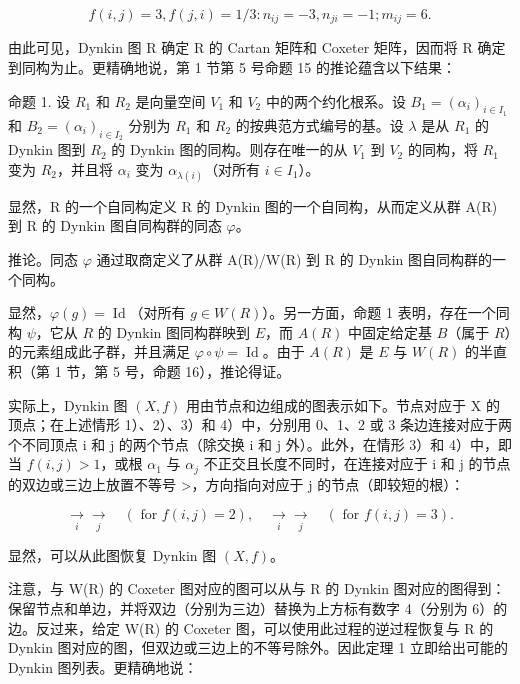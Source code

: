 \[
f (i, j) = 3, f (j, i) = 1 / 3: n _ {i j} = - 3, n _ {j i} = - 1; m _ {i j} = 6.
\]

由此可见，Dynkin 图 R 确定 R 的 Cartan 矩阵和 Coxeter 矩阵，因而将 R 确定到同构为止。更精确地说，第 1 节第 5 号命题 15 的推论蕴含以下结果：

命题 1. 设 \(R_{1}\) 和 \(R_{2}\) 是向量空间 \(V_{1}\) 和 \(V_{2}\) 中的两个约化根系。设 \(B_{1} = (\alpha_{i})_{i \in I_{1}}\) 和 \(B_{2} = (\alpha_{i})_{i \in I_{2}}\) 分别为 \(R_{1}\) 和 \(R_{2}\) 的按典范方式编号的基。设 \(\lambda\) 是从 \(R_{1}\) 的 Dynkin 图到 \(R_{2}\) 的 Dynkin 图的同构。则存在唯一的从 \(V_{1}\) 到 \(V_{2}\) 的同构，将 \(R_{1}\) 变为 \(R_{2}\)，并且将 \(\alpha_{i}\) 变为 \(\alpha_{\lambda(i)}\)（对所有 \(i \in I_{1}\)）。

显然，R 的一个自同构定义 R 的 Dynkin 图的一个自同构，从而定义从群 A(R) 到 R 的 Dynkin 图自同构群的同态 \(\varphi\)。

推论。同态 \(\varphi\) 通过取商定义了从群 A(R)/W(R) 到 R 的 Dynkin 图自同构群的一个同构。

显然，\(\varphi(g) = \operatorname{Id}\)（对所有 \(g \in W(R)\)）。另一方面，命题 1 表明，存在一个同构 \(\psi\)，它从 \(R\) 的 Dynkin 图同构群映到 \(E\)，而 \(A(R)\) 中固定给定基 \(B\)（属于 \(R\)）的元素组成此子群，并且满足 \(\varphi \circ \psi = \operatorname{Id}\)。由于 \(A(R)\) 是 \(E\) 与 \(W(R)\) 的半直积（第 1 节，第 5 号，命题 16），推论得证。

实际上，Dynkin 图 \((X, f)\) 用由节点和边组成的图表示如下。节点对应于 X 的顶点；在上述情形 1）、2）、3）和 4）中，分别用 0、1、2 或 3 条边连接对应于两个不同顶点 i 和 j 的两个节点（除交换 i 和 j 外）。此外，在情形 3）和 4）中，即当 \(f(i, j) > 1\)，或根 \(\alpha_{1}\) 与 \(\alpha_{j}\) 不正交且长度不同时，在连接对应于 i 和 j 的节点的双边或三边上放置不等号 \textgreater{}，方向指向对应于 j 的节点（即较短的根）：

\[
\underset {i} {\longrightarrow} \underset {j} {\longrightarrow} \quad (\text { for   } f (i, j) = 2), \quad \underset {i} {\longrightarrow} \underset {j} {\longrightarrow} \quad (\text { for   } f (i, j) = 3).
\]

显然，可以从此图恢复 Dynkin 图 \((X, f)\)。

注意，与 W(R) 的 Coxeter 图对应的图可以从与 R 的 Dynkin 图对应的图得到：保留节点和单边，并将双边（分别为三边）替换为上方标有数字 4（分别为 6）的边。反过来，给定 W(R) 的 Coxeter 图，可以使用此过程的逆过程恢复与 R 的 Dynkin 图对应的图，但双边或三边上的不等号除外。因此定理 1 立即给出可能的 Dynkin 图列表。更精确地说：

